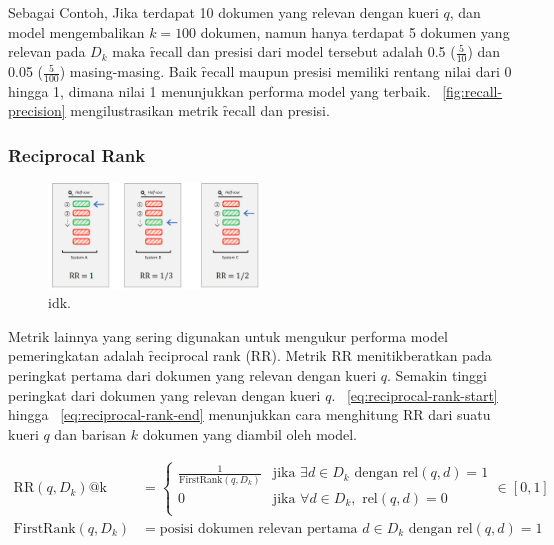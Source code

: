         Sebagai Contoh, Jika terdapat 10 dokumen yang relevan dengan kueri $q$, dan model mengembalikan $k=100$ dokumen, namun hanya terdapat 5 dokumen yang relevan pada $D_k$  maka \f{recall} dan presisi dari model tersebut adalah 0.5 ($\frac{5}{10}$) dan 0.05 ($\frac{5}{100}$) masing-masing. Baik \f{recall} maupun presisi memiliki rentang nilai dari 0 hingga 1, dimana nilai 1 menunjukkan performa model yang terbaik. \pic~\ref{fig:recall-precision} mengilustrasikan metrik \f{recall} dan presisi.

        \subsubsection{\f{Reciprocal Rank}}

        \begin{figure}
            \centering
            \includegraphics[width=0.50\textwidth]{assets/pics/rr.png}
            \caption{idk.}
            \label{fig:reciprocal-rank}
        \end{figure}

        Metrik lainnya yang sering digunakan untuk mengukur performa model pemeringkatan adalah \f{reciprocal rank} (RR). Metrik RR menitikberatkan pada peringkat pertama dari dokumen yang relevan dengan kueri $q$. Semakin tinggi peringkat dari dokumen yang relevan dengan kueri $q$. \equ~\ref{eq:reciprocal-rank-start} hingga \equ~\ref{eq:reciprocal-rank-end} menunjukkan cara menghitung RR dari suatu kueri $q$ dan barisan $k$ dokumen yang diambil oleh model.

        \begin{align}
            \text{RR}(q, D_k)\text{@k} &= \begin{cases}
                \label{eq:reciprocal-rank-start}
                \frac{1}{\text{FirstRank}(q, D_k)} & \text{jika } \exists d \in D_k \text{ dengan } \text{rel}(q, d) = 1 \\        
                0 & \text{jika } \forall d \in D_k, \text{ rel}(q, d) = 0 \\
                \end{cases} \in [0, 1] \\
                \label{eq:reciprocal-rank-end}
                \text{FirstRank}(q,D_k) &= \text{posisi dokumen relevan pertama } d\in D_k \text{ dengan } \text{rel}(q, d) = 1
        \end{align}

